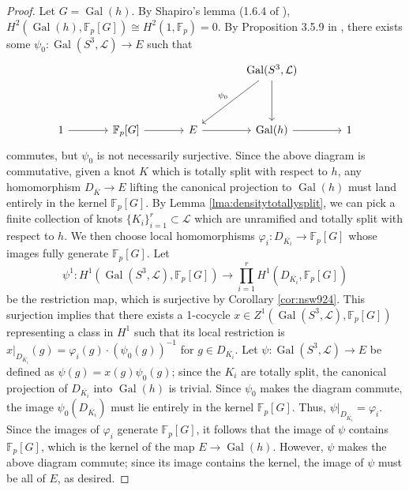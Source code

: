 \documentclass{amsart}
\theoremstyle{plain}
\theoremstyle{definition}
\theoremstyle{plain}
\theoremstyle{plain}
\theoremstyle{plain}
\theoremstyle{remark}
\theoremstyle{remark}
\theoremstyle{plain}
\theoremstyle{definition}
\theoremstyle{plain}
\DeclareMathOperator{\Gal}{\mathrm{Gal}}
\theoremstyle{plain}
\theoremstyle{plain}
\numberwithin{equation}{section}
\begin{document}
\begin{proof}
Let $G = \Gal(h)$. By Shapiro's lemma (1.6.4 of \cite{neukirch2013cohomology}), $H^2(\Gal(h), \mathbb{F}_p[G]) \cong H^2(1, \mathbb{F}_p) = 0$. By Proposition 3.5.9 in \cite{neukirch2013cohomology}, there exists some $\psi_0: \Gal(S^3, \mathcal{L}) \to E$ such that 
\[
\begin{tikzcd}[column sep=large, row sep=large]
& & & \mathrm{Gal}(S^3, \mathcal{L}) \arrow[d] \arrow[dl, "\psi_0"'] \\[1em]
1 \arrow[r] 
& \mathbb{F}_p[G] \arrow[r] 
& E \arrow[r] 
& \Gal(h) \arrow[r]
& 1
\end{tikzcd}
\]
commutes, but $\psi_0$ is not necessarily surjective. Since the above diagram is commutative, given a knot $K$ which is totally split with respect to $h$, any homomorphism $D_{\overline{K}} \to E$ lifting the canonical projection to $\Gal(h)$ must land entirely in the kernel $\mathbb{F}_p[G]$. By Lemma \ref{lma:densitytotallysplit}, we can pick a finite collection of knots $\{K_i\}_{i=1}^r \subset \mathcal{L}$ which are unramified and totally split with respect to $h$. We then choose local homomorphisms $\varphi_i: D_{\overline{K_i}} \to \mathbb{F}_p[G]$ whose images fully generate $\mathbb{F}_p[G]$. Let
\begin{equation}
    \psi^1: H^1(\Gal(S^3, \mathcal{L}), \mathbb{F}_p[G]) \to \prod_{i=1}^rH^1(D_{\overline{K_i}}, \mathbb{F}_p[G])
\end{equation}
be the restriction map, which is surjective by Corollary \ref{cor:nsw924}. This surjection implies that there exists a 1-cocycle $x \in Z^1(\Gal(S^3, \mathcal{L}), \mathbb{F}_p[G])$ representing a class in $H^1$ such that its local restriction is $x|_{D_{\overline{K_i}}}(g) = \varphi_i(g) \cdot (\psi_0(g))^{-1}$ for $g \in D_{\overline{K_i}}$. Let $\psi: \Gal(S^3, \mathcal{L}) \to E$ be defined as $\psi(g) = x(g)\psi_0(g)$; since the $K_i$ are totally split, the canonical projection of $D_{\overline{K_i}}$ into $\Gal(h)$ is trivial. Since $\psi_0$ makes the diagram commute, the image $\psi_0(D_{\overline{K_i}})$ must lie entirely in the kernel $\mathbb{F}_p[G]$. Thus, $\psi|_{D_{\overline{K_i}}} = \varphi_i$. Since the images of $\varphi_i$ generate $\mathbb{F}_p[G]$, it follows that the image of $\psi$ contains $\mathbb{F}_p[G]$, which is the kernel of the map $E \to \Gal(h)$. However, $\psi$ makes the above diagram commute; since its image contains the kernel, the image of $\psi$ must be all of $E$, as desired. 
\end{proof}
\end{document}
